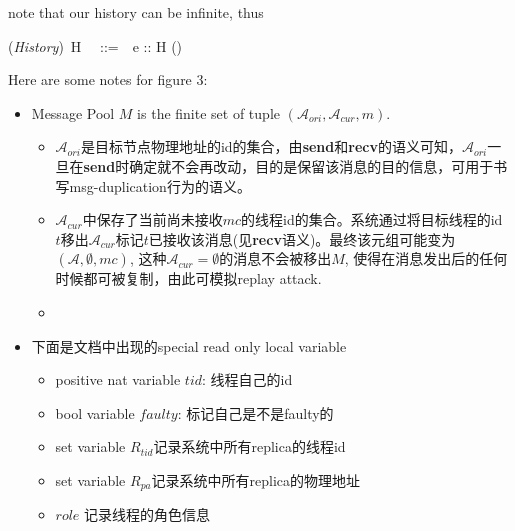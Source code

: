 \documentclass[UTF8, 8pt, a4paper ]{ctexart}
\newcommand{\addrSet}{\mathcal{A}}
\begin{document}
\begin{small}
		note that our history can be infinite, thus 
		\begin{kfomula}{0.1}
			(\!\textit{History})\ H \ \ ::=\  \ \epsilon \mid e :: H \qquad\qquad  ()
		\end{kfomula} 
	
	\kspace
	
	Here are some notes for {figure 3}:
	\begin{itemize}
		\item {Message Pool} $ M $ is the finite set of tuple $ (\addrSet_\textit{ori}, \addrSet_\textit{cur}, m) $. 
		\begin{itemize}
			\item $ \addrSet_\textit{ori} $是目标节点物理地址的id的集合，由\textbf{send}和\textbf{recv}的语义可知，$ \addrSet_\textit{ori} $一旦在\textbf{send}时确定就不会再改动，目的是保留该消息的目的信息，可用于书写msg-duplication行为的语义。
			
			\item $ \addrSet_{\textit{cur}} $中保存了当前尚未接收$ mc $的线程id的集合。系统通过将目标线程的id $ t $移出$ \addrSet_{\textit{cur}} $标记$ t $已接收该消息(见\textbf{recv}语义)。最终该元组可能变为$ (\addrSet, \emptyset, mc) $, 这种$ \addrSet_{cur} = \emptyset $的消息不会被移出$ M $, 使得在消息发出后的任何时候都可被复制，由此可模拟replay attack. 
			
			\item {}
		\end{itemize}
		
		
		
		\item 下面是文档中出现的special read only local variable
		\begin{itemize}
			\item positive nat variable $ \textit{tid} $: 线程自己的id
						
			\item bool variable $ \textit{faulty} $: 标记自己是不是faulty的
			
			\item set variable $ R_{tid} $记录系统中所有replica的线程id
			
			\item set variable $ R_{pa} $记录系统中所有replica的物理地址
			
			
			\item $ \textit{role} $ 记录线程的角色信息
			

\end{itemize}
\end{itemize}
\end{small}
\end{document}
